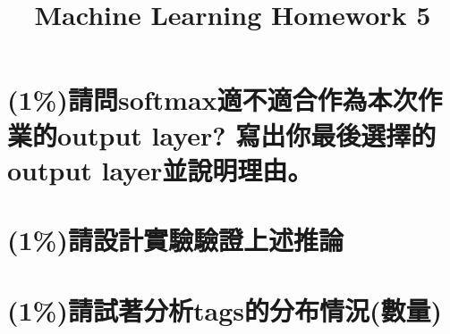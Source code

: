 \documentclass[fleqn,a4paper,12pt]{article}
\title{Machine Learning Homework 5}
\date{}
\begin{document}
\thispagestyle{fancy}

\section{(1\%)請問softmax適不適合作為本次作業的output layer? 寫出你最後選擇的output layer並說明理由。}
\section{(1\%)請設計實驗驗證上述推論}
\section{(1\%)請試著分析tags的分布情況(數量)}
\end{document}
